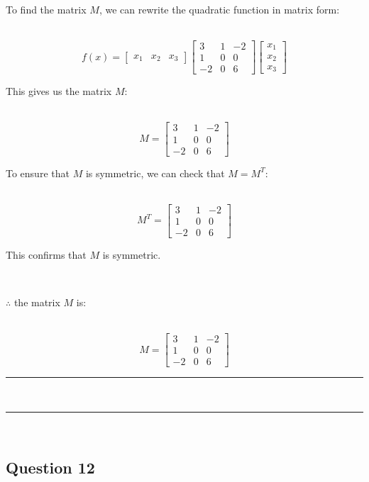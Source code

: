 \documentclass{article}
\begin{document}
\parbox{\textwidth}{To find the matrix $M$, we can rewrite the quadratic function in matrix form:}\\

$$f(x) = \begin{bmatrix} x_1 & x_2 & x_3 \end{bmatrix} \begin{bmatrix} 3 & 1 & -2 \\ 1 & 0 & 0 \\ -2 & 0 & 6 \end{bmatrix} \begin{bmatrix} x_1 \\ x_2 \\ x_3 \end{bmatrix}$$

\parbox{\textwidth}{This gives us the matrix $M$:}\\

$$M = \begin{bmatrix} 3 & 1 & -2 \\ 1 & 0 & 0 \\ -2 & 0 & 6 \end{bmatrix}$$

\parbox{\textwidth}{To ensure that $M$ is symmetric, we can check that $M = M^T$:}\\

$$M^T = \begin{bmatrix} 3 & 1 & -2 \\ 1 & 0 & 0 \\ -2 & 0 & 6 \end{bmatrix}$$

\parbox{\textwidth}{This confirms that $M$ is symmetric.}\\

\parbox{\textwidth}{$\therefore$ the matrix $M$ is:}\\

$$M = \begin{bmatrix} 3 & 1 & -2 \\ 1 & 0 & 0 \\ -2 & 0 & 6 \end{bmatrix}$$

\noindent\rule{\textwidth}{0.4pt}\\

\noindent\rule{\textwidth}{0.4pt}\\

\newpage

\subsection*{Question 12}
\end{document}

